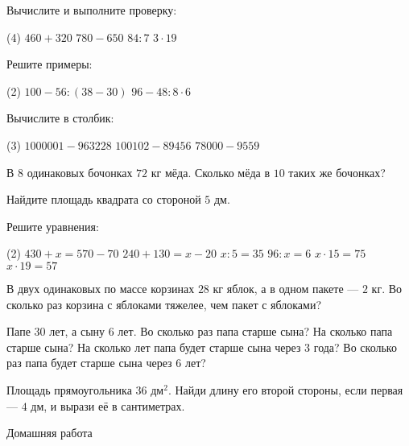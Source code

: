 %
%

\begin{class}[number=1]
	\begin{listofex}
		\item Вычислите и выполните проверку:
		\begin{tasks}(4)
			\task \( 460+320 \)
			\task \( 780-650 \)
			\task \( 84:7 \)
			\task \( 3\cdot19 \)
		\end{tasks}
		\item Решите примеры:
		\begin{tasks}(2)
			\task \( 100-56:(38-30) \)
			\task \( 96-48:8\cdot6 \)
		\end{tasks}
		\item Вычислите в столбик:
		\begin{tasks}(3)
			\task \( 1000001-963228 \)
			\task \( 100102-89456 \)
			\task \( 78000-9559 \)
		\end{tasks}
		\item В \( 8 \) одинаковых бочонках \( 72 \) кг мёда. Сколько мёда в \( 10 \) таких же бочонках?
		\item Найдите площадь квадрата со стороной \( 5 \) дм.
		\item Решите уравнения:
		\begin{tasks}(2)
			\task \( 430+x=570-70 \)
			\task \( 240+130=x-20 \)
			\task \( x:5=35 \)
			\task \( 96:x=6 \)
			\task \( x\cdot15=75 \)
			\task \( x\cdot19=57 \)
		\end{tasks}
		\item В двух одинаковых по массе корзинах \( 28 \) кг яблок, а в одном пакете --- \( 2 \) кг. Во сколько раз корзина с яблоками тяжелее, чем пакет с яблоками?
		\item Папе \( 30 \) лет, а сыну \( 6 \) лет. Во сколько раз папа старше сына? На сколько папа старше сына? На сколько лет папа будет старше сына через \( 3 \) года? Во сколько раз папа будет старше сына через \( 6 \) лет?
		\item Площадь прямоугольника \( 36 \) дм\( ^2 \). Найди длину его второй стороны, если первая --- \( 4 \) дм, и вырази её в сантиметрах.
	\end{listofex}
\end{class}

\begin{homework}[number=1]
		\begin{listofex}
			\item Домашняя работа
		\end{listofex}
\end{homework}

